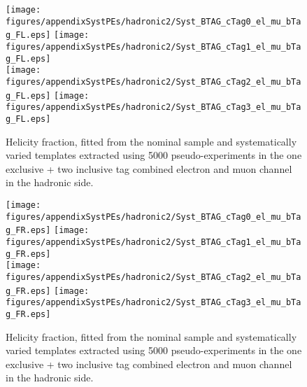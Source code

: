 \begin{figure}[!hb]
\begin{center}
        \texttt{[image: figures/appendixSystPEs/hadronic2/Syst\_BTAG\_cTag0\_el\_mu\_bTag\_FL.eps]}
        \texttt{[image: figures/appendixSystPEs/hadronic2/Syst\_BTAG\_cTag1\_el\_mu\_bTag\_FL.eps]}\\
        \texttt{[image: figures/appendixSystPEs/hadronic2/Syst\_BTAG\_cTag2\_el\_mu\_bTag\_FL.eps]}
        \texttt{[image: figures/appendixSystPEs/hadronic2/Syst\_BTAG\_cTag3\_el\_mu\_bTag\_FL.eps]}
        
\caption{Helicity fraction, \fl fitted from the nominal \ttbar sample and systematically varied templates extracted using 5000 pseudo-experiments in the one exclusive + two inclusive \bt tag combined electron and muon channel in the hadronic side. }
\label{fig:systematicVar_lep_fL_elmu2incl_btag2}
\end{center}
\end{figure}

\begin{figure}[!hb]
\begin{center}
        \texttt{[image: figures/appendixSystPEs/hadronic2/Syst\_BTAG\_cTag0\_el\_mu\_bTag\_FR.eps]}
        \texttt{[image: figures/appendixSystPEs/hadronic2/Syst\_BTAG\_cTag1\_el\_mu\_bTag\_FR.eps]}\\
        \texttt{[image: figures/appendixSystPEs/hadronic2/Syst\_BTAG\_cTag2\_el\_mu\_bTag\_FR.eps]}
        \texttt{[image: figures/appendixSystPEs/hadronic2/Syst\_BTAG\_cTag3\_el\_mu\_bTag\_FR.eps]}
        
\caption{Helicity fraction, \fr fitted from the nominal \ttbar sample and systematically varied templates extracted using 5000 pseudo-experiments in the one exclusive + two inclusive \bt tag combined electron and muon channel in the hadronic side. }
\label{fig:systematicVar_lep_fR_elmu2incl_btag2}
\end{center}
\end{figure}

